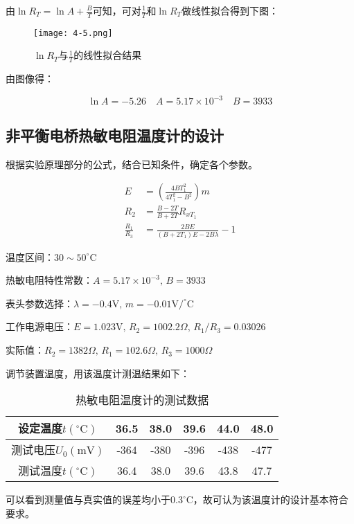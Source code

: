 \documentclass[12pt]{article}
\begin{document}
由$\ln R_T = \ln A+\frac{B}{T}$可知，可对$\frac{1}{T}$和$\ln R_T$做线性拟合得到下图：

\begin{figure}[htbp]
    \centering
    \texttt{[image: 4-5.png]}
    \caption{$\ln R_T$与$\frac{1}{T}$的线性拟合结果}
\end{figure}

由图像得：

\[
    \ln A=-5.26 \quad A=5.17\times10^{-3} \quad B=3933
\]

\subsection{非平衡电桥热敏电阻温度计的设计}
根据实验原理部分的公式，结合已知条件，确定各个参数。

\[
    \begin{aligned}
        E&=\left(\frac{4BT_1^2}{4T_1^2-B^2}\right)m \\
        R_2&=\frac{B-2T}{B+2T}R_{xT_1} \\
        \frac{R_1}{R_3}&=\frac{2BE}{(B+2T_1)E-2B\lambda}-1
    \end{aligned}
\]

温度区间：$30\sim50^\circ\mathrm{C}$

热敏电阻特性常数：$A=5.17\times10^{-3},\,B=3933$

表头参数选择：$\lambda=-0.4\mathrm{V},\,m=-0.01\mathrm{V/^\circ C}$

工作电源电压：$E=1.023\mathrm{V},\,R_2=1002.2\Omega,\,R_1/R_3=0.03026$

实际值：$R_2=1382\Omega,\,R_1=102.6\Omega,\,R_3=1000\Omega$

调节装置温度，用该温度计测温结果如下：

\begin{table}[htbp]
    \centering
    \begin{tabular}{|c|c|c|c|c|c|}
    \hline
    设定温度$t(^\circ\mathrm{C})$ & 36.5  & 38.0  & 39.6  & 44.0  & 48.0  \\
    \hline
    测试电压$U_0(\mathrm{mV})$ & -364 & -380 & -396 & -438 & -477 \\
    \hline
    测试温度$t(^\circ\mathrm{C})$ & 36.4  & 38.0  & 39.6  & 43.8  & 47.7  \\
    \hline
    \end{tabular}
    \caption{热敏电阻温度计的测试数据}
\end{table}

可以看到测量值与真实值的误差均小于$0.3^\circ\mathrm{C}$，故可认为该温度计的设计基本符合要求。
\end{document}
